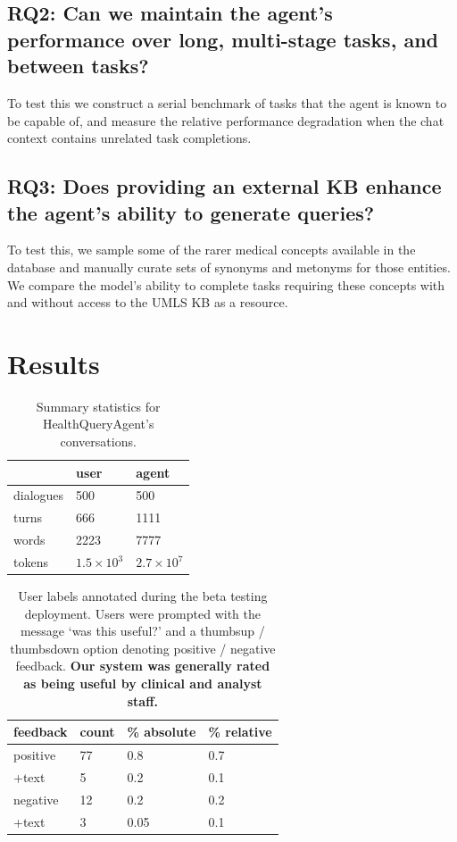 \documentclass[11pt]{article}
\begin{document}
\subsection*{RQ2: Can we maintain the agent's performance over long, multi-stage tasks, and between tasks?}

To test this we construct a serial benchmark of tasks that the agent is known to be capable of, and measure the relative performance degradation when the chat context contains unrelated task completions.

\subsection*{RQ3: Does providing an external KB enhance the agent's ability to generate queries?}

To test this, we sample some of the rarer medical concepts available in the database and manually curate sets of synonyms and metonyms for those entities.
We compare the model's ability to complete tasks requiring these concepts with and without access to the UMLS KB as a resource.

\section{Results}

\begin{table}[ht]
\centering
\begin{tabular}{|l|l|l|}
\hline
	& user & agent \\
\hline
	dialogues	& 500 & 500   \\
	turns		& 666 & 1111  \\
	words 		& 2223 & 7777 \\
	tokens		& $1.5 \times 10^3$ & $2.7 \times 10^7$ \\
\hline
\end{tabular}
\caption{Summary statistics for HealthQueryAgent's conversations.}
\label{tab:conversation-statistics}
\end{table}

\begin{table}[ht]
\centering
\begin{tabular}{|l|l|l|l|}
\hline
	feedback	& count & \% absolute	& \% relative \\	
\hline
	positive 	& 77	& 0.8		& 0.7	\\
\hspace{0.5cm} +text 	& 5	& 0.2		& 0.1 \\
\hline
	negative 	& 12 	& 0.2 		& 0.2 \\
\hspace{0.5cm} +text	& 3	& 0.05		& 0.1	\\
\hline	
\end{tabular}
\caption{
	User labels annotated during the beta testing deployment.
	Users were prompted with the message `was this useful?' and a thumbsup / thumbsdown option denoting positive / negative feedback.
	\textbf{Our system was generally rated as being useful by clinical and analyst staff.}	
}
\label{tab:user-feedback}
\end{table}
\end{document}
